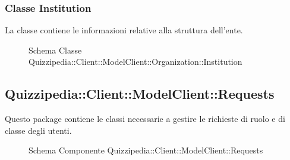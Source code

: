 \subsubsection{Classe Institution}
La classe contiene le informazioni relative alla struttura dell'ente.
\begin{figure}[H]
\centering
\noindent{}
\caption[Schema Classe Institution]{Schema Classe Quizzipedia::Client::ModelClient::Organization::Institution}
\end{figure}
\subsection{Quizzipedia::Client::ModelClient::Requests}
Questo package contiene le classi necessarie a gestire le richieste di ruolo e di classe degli utenti.
\begin{figure}[H]
\centering
\noindent{}
\caption[Schema Componente Quizzipedia::Client::ModelClient::Requests]{Schema Componente Quizzipedia::Client::ModelClient::Requests}
\end{figure}
